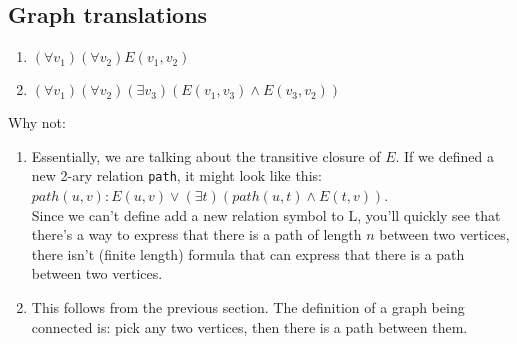 \documentclass[10pt,a4paper]{article}
\begin{document}
\subsection{Graph translations}
\begin{enumerate}
    \item \( (\forall v_1) (\forall v_2) E(v_1, v_2) \)
    \item \( (\forall v_1) (\forall v_2) (\exists v_3) (E(v_1, v_3) \land E(v_3, v_2)) \)
\end{enumerate}

Why not:
\begin{enumerate}
    \item Essentially, we are talking about the transitive closure of \(E\).
    If we defined a new 2-ary relation \texttt{path}, it might look like this:
    \( path(u, v) : E(u, v) \lor (\exists t) (path(u, t) \land E(t, v)) \). \\
    Since we can't define add a new relation symbol to L, 
    you'll quickly see that there's a way to express that there is a path of length \(n\) between two vertices,
    there isn't (finite length) formula that can express that there is a path between two vertices.
    \item This follows from the previous section.
    The definition of a graph being connected is: pick any two vertices, then there is a path between them.
\end{enumerate}
\end{document}
